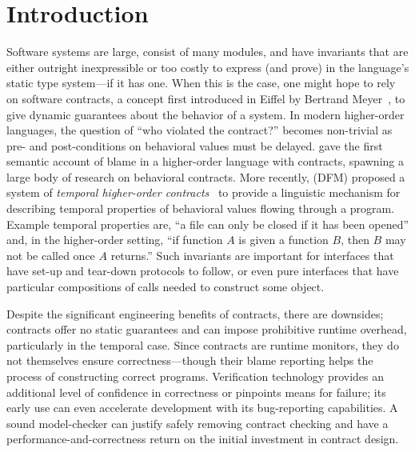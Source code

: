 
\section{Introduction}\label{sec:intro}

Software systems are large, consist of many modules, and have invariants that are either outright inexpressible or too costly to express (and prove) in the language's static type system---if it has one.
%
When this is the case, one might hope to rely on software contracts, a
concept first introduced in Eiffel by Bertrand
Meyer~\cite{dvanhorn:meyer-eiffel}, to give dynamic guarantees about
the behavior of a system.
%
In modern higher-order languages, the question of ``who violated the contract?'' becomes non-trivial
as pre- and post-conditions on behavioral values must be delayed.
%
\citet{dvanhorn:Findler2002Contracts} gave the
first semantic account of blame in a higher-order language with
contracts, spawning a large body of research on behavioral contracts.
%
More recently, \citeauthor*{ianjohnson:DBLP:conf/icfp/DisneyFM11}
(DFM) proposed a system of \emph{temporal higher-order
  contracts}~\citep{ianjohnson:DBLP:conf/icfp/DisneyFM11} to provide a
linguistic mechanism for describing temporal properties of behavioral
values flowing through a program.
%
%
Example temporal properties are, ``a file can only be closed if it has been opened'' and, in the higher-order setting, ``if function $A$ is given a function $B$, then $B$ may not be called once $A$ returns.''
%
Such invariants are important for interfaces that have set-up and tear-down protocols to follow, or even pure interfaces that have particular compositions of calls needed to construct some object.

Despite the significant engineering benefits of contracts, there are
downsides; contracts offer no static guarantees and can impose
prohibitive runtime overhead, particularly in the temporal case.
%
Since contracts are runtime monitors, they do not themselves ensure correctness---though their blame reporting helps the process of constructing correct programs.
%
Verification technology provides an additional level of confidence in correctness or pinpoints means for failure; its early use can even accelerate development with its bug-reporting capabilities.
%
A sound model-checker can justify safely removing contract checking and have a performance-and-correctness return on the initial investment in contract design.

